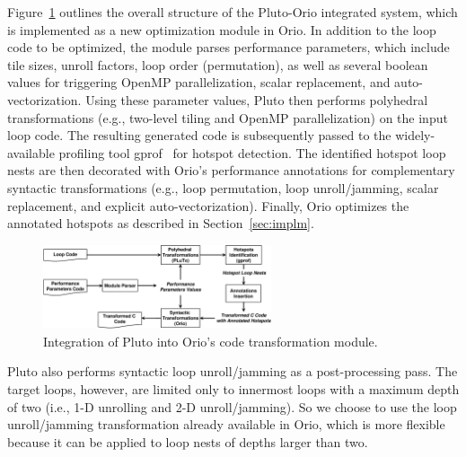 Figure~\ref{fig:pluto-orio} outlines the overall structure of the Pluto-Orio
integrated system, which is implemented as a new optimization module in
Orio.
In addition to the loop code to be optimized, the module parses performance
parameters, which include tile sizes, unroll factors, loop order
(permutation), as well as several boolean values for triggering OpenMP
parallelization, scalar replacement, and auto-vectorization. Using these
parameter values, Pluto then performs polyhedral transformations (e.g.,
two-level tiling and OpenMP parallelization) on the input loop code. The
resulting generated code is subsequently passed to the widely-available
profiling tool gprof~\cite{gprof} for hotspot detection. 
The identified hotspot loop nests are then decorated with Orio's performance
annotations for complementary syntactic transformations (e.g., loop
permutation, loop unroll/jamming, scalar replacement, and explicit
auto-vectorization). Finally, Orio optimizes the annotated hotspots as 
described in Section~\ref{sec:implm}.

\begin{figure}[tb]
\begin{center}
\includegraphics[width=0.6\textwidth]{figures/pluto-orio.eps}    
\end{center}   
\vspace{-.2in}
\caption{Integration of Pluto into Orio's code transformation module.}
\label{fig:pluto-orio}
\end{figure}  

Pluto also performs syntactic loop unroll/jamming as a post-processing
pass. The target loops, however, are limited only to innermost loops with a
maximum depth of two (i.e., 1-D unrolling and 2-D unroll/jamming). So we
choose to use the loop unroll/jamming transformation already available in
Orio, which is more flexible because it can be applied to loop nests of
depths larger than two.

